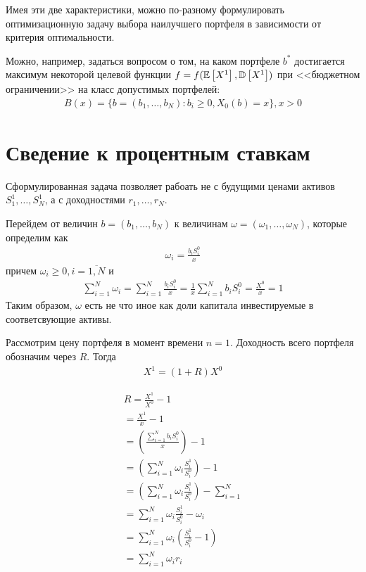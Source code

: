 Имея эти две характеристики, можно по-разному формулировать оптимизационную задачу выбора наилучшего портфеля в
зависимости от критерия оптимальности.

Можно, например, задаться вопросом о том, на каком портфеле $b^*$ достигается максимум некоторой целевой функции 
$f = f(\mathbb{E}\left[X^1\right], \mathbb{D}\left[X^1\right])$ при <<бюджетном ограничении>> на класс допустимых портфелей:
\begin{align}
	B(x) = \{b=(b_1, \dots, b_N): b_i \ge 0, X_0(b) = x\}, x > 0
\end{align}


\section{Сведение к процентным ставкам}

Сформулированная задача позволяет рабоать не с будущими ценами активов $S_1^1, \dots, S_N^1$,
а с доходностями $r_1, \dots, r_N$.

Перейдем от величин $b = (b_1, \dots, b_N)$ к величинам $\omega = (\omega_1, \dots, \omega_N)$, которые определим как
\begin{align}
	\omega_i = \frac{b_i S_i^0}{x}
\end{align}
причем $\omega_i \ge 0, i=\overline{1, N}$ и
\begin{align}
	\sum_{i=1}^{N} \omega_i 
	= \sum_{i=1}^{N} \frac{b_i S_i^0}{x}
	= \frac{1}{x} \sum_{i=1}^{N} b_i S_i^0
	= \frac{X^0}{x} = 1
\end{align}
Таким образом, $\omega$ есть не что иное как доли капитала инвестируемые в соответсвующие активы.

Рассмотрим цену портфеля в момент времени $n=1$. Доходность всего портфеля обозначим через $R$. Тогда
\begin{align}
	X^1 = (1 + R) X^0
\end{align}

\begin{multline}
	R = \frac{X^1}{X^0} - 1 \\
	= \frac{X^1}{x} - 1 \\
	= \left(\frac{\sum_{i=1}^{N}b_i S_i^0}{x}\right) - 1 \\
	= \left(\sum_{i=1}^{N} \omega_i \frac{S_i^1}{S_i^0}\right) - 1 \\
	= \left(\sum_{i=1}^{N} \omega_i \frac{S_i^1}{S_i^0}\right) - \sum_{i=1}^{N} \\
	= \sum_{i=1}^{N} \omega_i \frac{S_i^1}{S_i^0} - \omega_i \\
	= \sum_{i=1}^{N} \omega_i \left(\frac{S_i^1}{S_i^0} - 1\right) \\
	= \sum_{i=1}^{N} \omega_i r_i
\end{multline}

